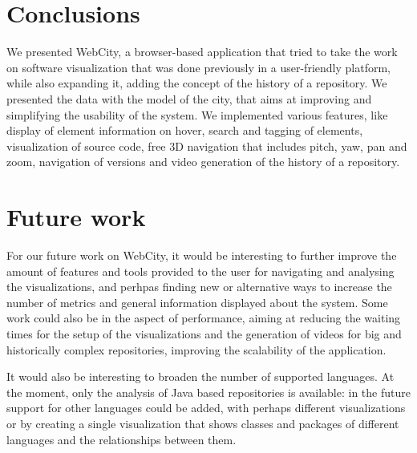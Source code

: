 \documentclass[]{usiinfbachelorproject}
\begin{document}
\section{Conclusions} \label{Conclusions}
We presented WebCity, a browser-based application that tried to take the work on software visualization that was done previously in a user-friendly platform, while also expanding it, adding the concept of the history of a repository.
We presented the data with the model of the city, that aims at improving and simplifying the usability of the system.
We implemented various features, like display of element information on hover, search and tagging of elements, visualization of source code, free 3D navigation that includes pitch, yaw, pan and zoom, navigation of versions and video generation of the history of a repository.

\section{Future work} \label{Future work}

For our future work on WebCity, it would be interesting to further improve the amount of features and tools provided to the user for navigating and analysing the visualizations, and perhpas finding new or alternative ways to increase the number of metrics and general information displayed about the system.
Some work could also be in the aspect of performance, aiming at reducing the waiting times for the setup of the visualizations and the generation of videos for big and historically complex repositories, improving the scalability of the application.

It would also be interesting to broaden the number of supported languages. At the moment, only the analysis of Java based repositories is available: in the future support for other languages could be added, with perhaps different visualizations or by creating a single visualization that shows classes and packages of different languages and the relationships between them.
\end{document}
